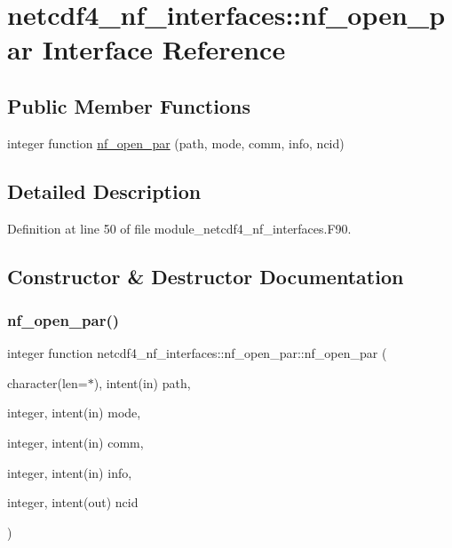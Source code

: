 \hypertarget{interfacenetcdf4__nf__interfaces_1_1nf__open__par}{}\section{netcdf4\+\_\+nf\+\_\+interfaces\+:\+:nf\+\_\+open\+\_\+par Interface Reference}
\label{interfacenetcdf4__nf__interfaces_1_1nf__open__par}
\subsection*{Public Member Functions}
\begin{DoxyCompactItemize}
\item 
integer function \hyperlink{interfacenetcdf4__nf__interfaces_1_1nf__open__par_acd2efd8840d909f242f37e3acca6ea3e}{nf\+\_\+open\+\_\+par} (path, mode, comm, info, ncid)
\end{DoxyCompactItemize}


\subsection{Detailed Description}


Definition at line 50 of file module\+\_\+netcdf4\+\_\+nf\+\_\+interfaces.\+F90.



\subsection{Constructor \& Destructor Documentation}
\mbox{\label{interfacenetcdf4__nf__interfaces_1_1nf__open__par_acd2efd8840d909f242f37e3acca6ea3e}} 
\subsubsection{\texorpdfstring{nf\+\_\+open\+\_\+par()}{nf\_open\_par()}}
{\footnotesize\ttfamily integer function netcdf4\+\_\+nf\+\_\+interfaces\+::nf\+\_\+open\+\_\+par\+::nf\+\_\+open\+\_\+par (\begin{DoxyParamCaption}\item[{character(len=$\ast$), intent(in)}]{path,  }\item[{integer, intent(in)}]{mode,  }\item[{integer, intent(in)}]{comm,  }\item[{integer, intent(in)}]{info,  }\item[{integer, intent(out)}]{ncid }\end{DoxyParamCaption})}



